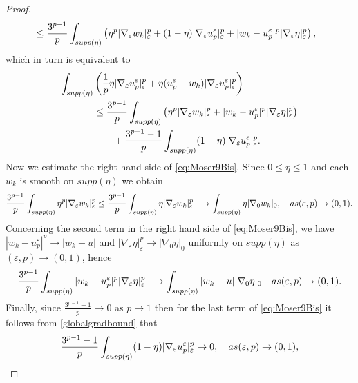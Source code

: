 \documentclass[10pt]{amsart}
\numberwithin{equation}{section}
\theoremstyle{definition}
\begin{document}
\begin{proof}
\begin{equation*}
\begin{aligned}
&\leq \dfrac{3^{p-1}}{p}\int_{\rm{supp}(\eta)}\left( \eta^p |\nabla_{\varepsilon}w_k|_{\varepsilon}^{p} + (1-\eta) |\nabla_{\varepsilon}u_{p}^{\varepsilon}|_{\varepsilon}^{p} + |w_k-u_{p}^{\varepsilon}|^p |\nabla_{\varepsilon}\eta|_{\varepsilon}^{p}\right),
\end{aligned}
\end{equation*}
\noindent which in turn is equivalent to
\begin{equation}\label{eq:Moser9Bis}
\begin{aligned}
\int_{\rm{supp}(\eta)} &\left( \dfrac{1}{p}\eta |\nabla_{\varepsilon}u_{p}^{\varepsilon}|_{\varepsilon}^{p} + \eta (u_{p}^{\varepsilon}-w_k) |\nabla_{\varepsilon}u_{p}^{\varepsilon}|_{\varepsilon}^{p}\right)\\
&\leq \dfrac{3^{p-1}}{p}\int_{\rm{supp}(\eta)}\left( \eta^p |\nabla_{\varepsilon}w_k|_{\varepsilon}^{p} + |w_k-u_{p}^{\varepsilon}|^p |\nabla_{\varepsilon}\eta|_{\varepsilon}^{p}\right)\\
&\qquad + \dfrac{3^{p-1}-1}{p}\int_{\rm{supp}(\eta)} (1-\eta) |\nabla_{\varepsilon}u_{p}^{\varepsilon}|_{\varepsilon}^{p}.
\end{aligned}
\end{equation}
Now we estimate the right hand side of \eqref{eq:Moser9Bis}. Since $0 \leq \eta \leq 1$ and each $w_k$ is smooth on $supp (\eta)$ we obtain
\begin{equation}
\label{Moser-est1}
\dfrac{3^{p-1}}{p}\int_{\rm{supp}(\eta)} \eta^p |\nabla_{\varepsilon}w_k|_{\varepsilon}^{p} \leq \dfrac{3^{p-1}}{p}\int_{\rm{supp}(\eta)} \eta|\nabla_{\varepsilon}w_k|_{\varepsilon}^{p} \longrightarrow \int_{\rm{supp}(\eta)}\eta |\nabla_{0}w_k|_{0}, \quad \textrm{as } (\varepsilon, p) \to (0,1).
\end{equation}
Concerning the second term in the right hand side of \eqref{eq:Moser9Bis},  we have $ |w_k-u_{p}^{\varepsilon}|^p \to |w_k-u|$ and $|\nabla_\varepsilon \eta|_\varepsilon^p \to |\nabla_0 \eta|_0$ uniformly on $supp(\eta)$ as $(\varepsilon,p) \to (0,1)$, hence
\begin{equation}
\label{Moser-est2}
\dfrac{3^{p-1}}{p}\int_{\rm{supp}(\eta)} |w_k-u_{p}^{\varepsilon}|^p |\nabla_{\varepsilon}\eta|_{\varepsilon}^{p}  \longrightarrow \int_{\rm{supp}(\eta) }|w_k-u| |\nabla_{0}\eta|_{0} \quad \textrm{as } (\varepsilon, p) \to (0,1).\end{equation}
Finally, since $\tfrac{3^{p-1}-1}{p} \to 0$ as $p \to 1$ then for the last term of \eqref{eq:Moser9Bis} it follows from \eqref{globalgradbound} that
\begin{equation}
\label{Moser-est3}
\dfrac{3^{p-1}-1}{p}\int_{\rm{supp}(\eta)} (1-\eta) |\nabla_{\varepsilon}u_{p}^{\varepsilon}|_{\varepsilon}^{p} \to 0, \quad \textrm{as } (\varepsilon, p) \to (0,1),
\end{equation}


\end{proof}
\end{document}
